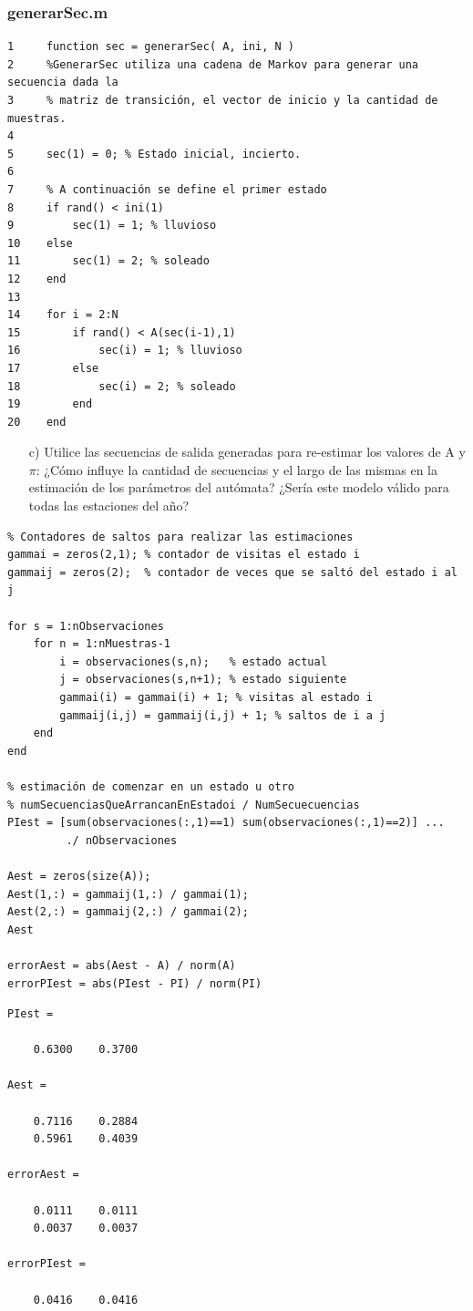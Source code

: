 \documentclass[11pt,a4paper,final]{article}
\begin{document}
\subsubsection{generarSec.m}

\begin{verbatim}
1     function sec = generarSec( A, ini, N )
2     %GenerarSec utiliza una cadena de Markov para generar una secuencia dada la
3     % matriz de transición, el vector de inicio y la cantidad de muestras.
4     
5     sec(1) = 0; % Estado inicial, incierto.
6     
7     % A continuación se define el primer estado
8     if rand() < ini(1)
9         sec(1) = 1; % lluvioso
10    else
11        sec(1) = 2; % soleado
12    end
13    
14    for i = 2:N
15        if rand() < A(sec(i-1),1)
16            sec(i) = 1; % lluvioso
17        else
18            sec(i) = 2; % soleado
19        end
20    end
\end{verbatim}
\begin{itemize}
   \item[c)] Utilice las secuencias de salida generadas para re-estimar los valores de A y $\pi$: ¿Cómo influye la cantidad de secuencias y el largo de las mismas en la estimación de los parámetros del autómata? ¿Sería este modelo válido para todas las estaciones del año?
\end{itemize}
\begin{verbatim}
% Contadores de saltos para realizar las estimaciones
gammai = zeros(2,1); % contador de visitas el estado i
gammaij = zeros(2);  % contador de veces que se saltó del estado i al j

for s = 1:nObservaciones
    for n = 1:nMuestras-1
        i = observaciones(s,n);   % estado actual
        j = observaciones(s,n+1); % estado siguiente
        gammai(i) = gammai(i) + 1; % visitas al estado i
        gammaij(i,j) = gammaij(i,j) + 1; % saltos de i a j
    end
end

% estimación de comenzar en un estado u otro
% numSecuenciasQueArrancanEnEstadoi / NumSecuecuencias
PIest = [sum(observaciones(:,1)==1) sum(observaciones(:,1)==2)] ...
         ./ nObservaciones

Aest = zeros(size(A));
Aest(1,:) = gammaij(1,:) / gammai(1);
Aest(2,:) = gammaij(2,:) / gammai(2);
Aest

errorAest = abs(Aest - A) / norm(A)
errorPIest = abs(PIest - PI) / norm(PI)
\end{verbatim}

\begin{verbatim}
PIest =

    0.6300    0.3700

Aest =

    0.7116    0.2884
    0.5961    0.4039

errorAest =

    0.0111    0.0111
    0.0037    0.0037

errorPIest =

    0.0416    0.0416
\end{verbatim}
    
\end{document}
